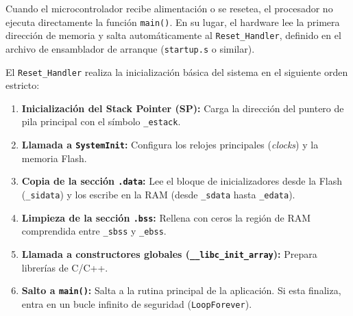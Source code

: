 \documentclass[../main.tex]{subfiles}
\begin{document}
        Cuando el microcontrolador recibe alimentación o se resetea, el procesador no ejecuta directamente la función \lstinline|main()|. En su lugar, el hardware lee la primera dirección de memoria y salta automáticamente al \lstinline|Reset_Handler|, definido en el archivo de ensamblador de arranque (\texttt{startup.s} o similar).

        El \lstinline|Reset_Handler| realiza la inicialización básica del sistema en el siguiente orden estricto:

        \begin{enumerate}
            \item \textbf{Inicialización del Stack Pointer (SP):} Carga la dirección del puntero de pila principal con el símbolo \texttt{\_estack}.
            \item \textbf{Llamada a \lstinline|SystemInit|:} Configura los relojes principales (\emph{clocks}) y la memoria Flash.
            \item \textbf{Copia de la sección \texttt{.data}:} Lee el bloque de inicializadores desde la Flash (\texttt{\_sidata}) y los escribe en la RAM (desde \texttt{\_sdata} hasta \texttt{\_edata}).
            \item \textbf{Limpieza de la sección \texttt{.bss}:} Rellena con ceros la región de RAM comprendida entre \texttt{\_sbss} y \texttt{\_ebss}.
            \item \textbf{Llamada a constructores globales (\lstinline|__libc_init_array|):} Prepara librerías de C/C++.
            \item \textbf{Salto a \lstinline|main()|:} Salta a la rutina principal de la aplicación. Si esta finaliza, entra en un bucle infinito de seguridad (\texttt{LoopForever}).
        \end{enumerate}
\end{document}
